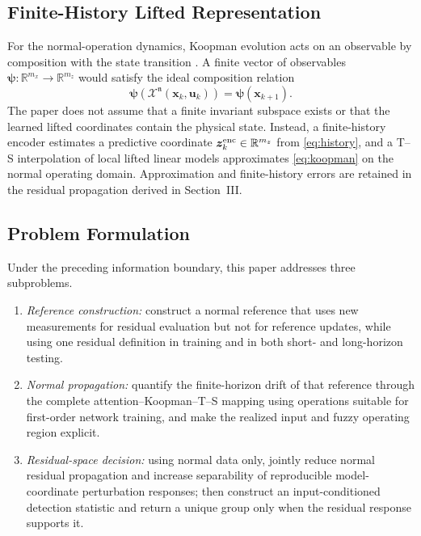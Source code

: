 \documentclass[journal]{IEEEtran}
\newcommand{\1}{\bm 1}
\begin{document}
\subsection{Finite-History Lifted Representation}
For the normal-operation dynamics, Koopman evolution acts on an observable by
composition with the state transition \cite{brunton2016}. A finite vector of
observables $\bm\psi:\mathbb R^{m_x}\rightarrow\mathbb R^{m_z}$
would satisfy the ideal composition relation
\begin{equation}
\bm\psi\!\left(\mathcal X^{\mathfrak n}(\bm x_k,\bm u_k)\right)
=\bm\psi(\bm x_{k+1}).
\label{eq:koopman}
\end{equation}
The paper does not assume that a finite invariant subspace exists or that the
learned lifted coordinates contain the physical state. Instead, a
finite-history encoder estimates a predictive coordinate
$\bm z_k^{\rm enc}\in\mathbb R^{m_z}$ from \eqref{eq:history}, and a T--S
interpolation
of local lifted linear models approximates \eqref{eq:koopman} on the normal
operating domain. Approximation and finite-history errors are retained in the
residual propagation derived in Section~III.

\subsection{Problem Formulation}
Under the preceding information boundary, this paper addresses three
subproblems.
\begin{enumerate}
\item \emph{Reference construction:} construct a normal reference that uses
new measurements for residual evaluation but not for reference updates, while
using one residual definition in training and in both short- and long-horizon
testing.

\item \emph{Normal propagation:} quantify the finite-horizon drift of that
reference through the complete attention--Koopman--T--S mapping using
operations suitable for first-order network training, and make the realized
input and fuzzy operating region explicit.

\item \emph{Residual-space decision:} using normal data only, jointly reduce
normal residual propagation and increase separability of reproducible
model-coordinate perturbation responses; then construct an input-conditioned
detection statistic and return a unique group only when the residual response
supports it.
\end{enumerate}
\end{document}
